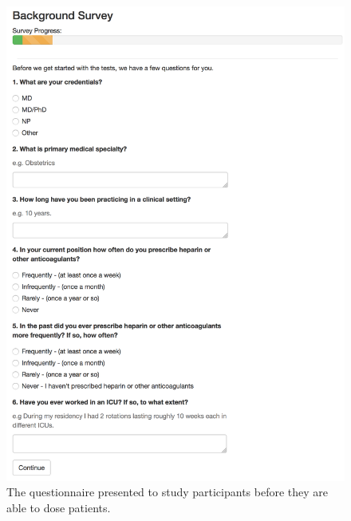 \documentclass[12pt,a4paper,]{report}
\begin{document}
\begin{figure}[H]
\noindent
\includegraphics[width=1\textwidth]{source/figures/presurvey2.png}
\caption{\label{fig:presurvey}The questionnaire presented to study participants before they are able to  dose patients.}
\end{figure}
\end{document}
